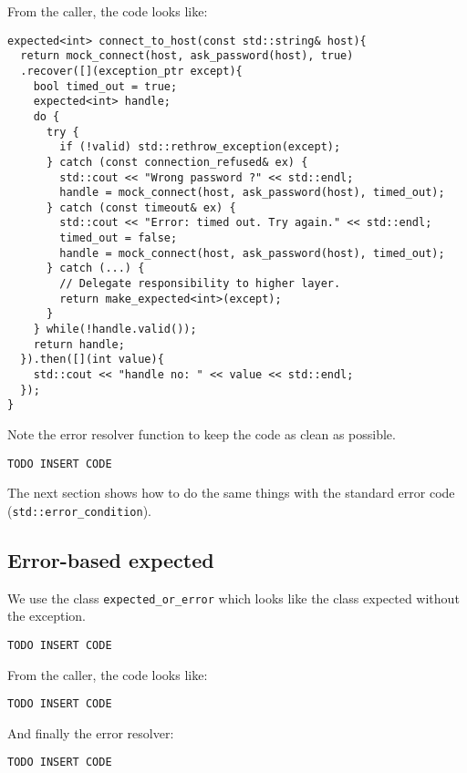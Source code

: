 \documentclass[a4paper,10pt]{article}
\newcommand{\cpp}[1]{\lstinline{#1}}
\begin{document}
From the caller, the code looks like:

\begin{lstlisting}
expected<int> connect_to_host(const std::string& host){
  return mock_connect(host, ask_password(host), true)
  .recover([](exception_ptr except){
    bool timed_out = true;
    expected<int> handle;
    do { 
      try {  
        if (!valid) std::rethrow_exception(except);
      } catch (const connection_refused& ex) {
        std::cout << "Wrong password ?" << std::endl;
        handle = mock_connect(host, ask_password(host), timed_out);
      } catch (const timeout& ex) {
        std::cout << "Error: timed out. Try again." << std::endl;
        timed_out = false;
        handle = mock_connect(host, ask_password(host), timed_out);
      } catch (...) {
        // Delegate responsibility to higher layer.
        return make_expected<int>(except);      
      }
    } while(!handle.valid());
    return handle;
  }).then([](int value){
    std::cout << "handle no: " << value << std::endl;
  });
}
\end{lstlisting}

Note the error resolver function to keep the code as clean as possible.

\begin{lstlisting}
TODO INSERT CODE
\end{lstlisting}

The next section shows how to do the same things with the standard error code (\cpp{std::error_condition}).

\subsection{Error-based expected}

We use the class \cpp{expected_or_error} which looks like the class expected without the exception.

\begin{lstlisting}
TODO INSERT CODE
\end{lstlisting}

From the caller, the code looks like:

\begin{lstlisting}
TODO INSERT CODE
\end{lstlisting}

And finally the error resolver:

\begin{lstlisting}
TODO INSERT CODE
\end{lstlisting}
\end{document}
